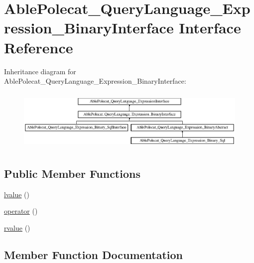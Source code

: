 \hypertarget{interface_able_polecat___query_language___expression___binary_interface}{}\section{Able\+Polecat\+\_\+\+Query\+Language\+\_\+\+Expression\+\_\+\+Binary\+Interface Interface Reference}
\label{interface_able_polecat___query_language___expression___binary_interface}
Inheritance diagram for Able\+Polecat\+\_\+\+Query\+Language\+\_\+\+Expression\+\_\+\+Binary\+Interface\+:\begin{figure}[H]
\begin{center}
\leavevmode
\includegraphics[height=2.994652cm]{interface_able_polecat___query_language___expression___binary_interface}
\end{center}
\end{figure}
\subsection*{Public Member Functions}
\begin{DoxyCompactItemize}
\item 
\hyperlink{interface_able_polecat___query_language___expression___binary_interface_a3441a080c58bdf934f6f24e8c0aea673}{lvalue} ()
\item 
\hyperlink{interface_able_polecat___query_language___expression___binary_interface_a27d661679d6ca841f034118ea52159d8}{operator} ()
\item 
\hyperlink{interface_able_polecat___query_language___expression___binary_interface_ac9c038619eb9e83d210e7dbd81888824}{rvalue} ()
\end{DoxyCompactItemize}


\subsection{Member Function Documentation}
\hypertarget{interface_able_polecat___query_language___expression___binary_interface_a3441a080c58bdf934f6f24e8c0aea673}{}
